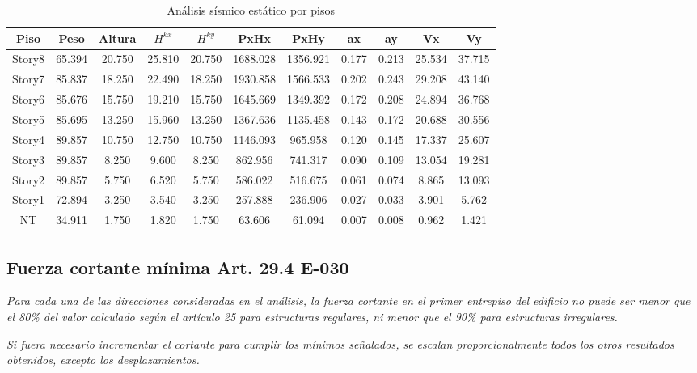 \documentclass{article}%
\begin{document}
%


\begin{table}[H]%
\centering%
\caption{Análisis sísmico estático por pisos}%
\begin{tabular}{ccccccccccc}
\toprule
Piso & Peso & Altura & $H^{kx}$ & $H^{ky}$ & PxHx & PxHy & ax & ay & Vx & Vy \\
\midrule
Story8 & 65.394 & 20.750 & 25.810 & 20.750 & 1688.028 & 1356.921 & 0.177 & 0.213 & 25.534 & 37.715 \\
Story7 & 85.837 & 18.250 & 22.490 & 18.250 & 1930.858 & 1566.533 & 0.202 & 0.243 & 29.208 & 43.140 \\
Story6 & 85.676 & 15.750 & 19.210 & 15.750 & 1645.669 & 1349.392 & 0.172 & 0.208 & 24.894 & 36.768 \\
Story5 & 85.695 & 13.250 & 15.960 & 13.250 & 1367.636 & 1135.458 & 0.143 & 0.172 & 20.688 & 30.556 \\
Story4 & 89.857 & 10.750 & 12.750 & 10.750 & 1146.093 & 965.958 & 0.120 & 0.145 & 17.337 & 25.607 \\
Story3 & 89.857 & 8.250 & 9.600 & 8.250 & 862.956 & 741.317 & 0.090 & 0.109 & 13.054 & 19.281 \\
Story2 & 89.857 & 5.750 & 6.520 & 5.750 & 586.022 & 516.675 & 0.061 & 0.074 & 8.865 & 13.093 \\
Story1 & 72.894 & 3.250 & 3.540 & 3.250 & 257.888 & 236.906 & 0.027 & 0.033 & 3.901 & 5.762 \\
NT & 34.911 & 1.750 & 1.820 & 1.750 & 63.606 & 61.094 & 0.007 & 0.008 & 0.962 & 1.421 \\
\bottomrule
\end{tabular}
%
\end{table}

%
\subsection{Fuerza cortante mínima Art. 29.4 E{-}030}%
\label{subsec:FuerzacortantemnimaArt.29.4E{-}030}%
\begin{tcolorbox}[colback=gray!5!white,colframe=cyan!75!black,fonttitle=\bfseries,title=Art. 29.4.1]%
\textit{Para cada una de las direcciones consideradas en el análisis, la fuerza cortante en el primer entrepiso del edificio no puede ser menor que el 80\% del valor calculado según el artículo 25 para estructuras regulares, ni menor que el 90\% para estructuras irregulares.}%
\end{tcolorbox}%
\begin{tcolorbox}[colback=gray!5!white,colframe=cyan!75!black,fonttitle=\bfseries,title=Art. 29.4.2]%
\textit{Si fuera necesario incrementar el cortante para cumplir los mínimos señalados,  se escalan proporcionalmente todos los otros resultados obtenidos, excepto los  desplazamientos.}%
\end{tcolorbox}%
\end{document}
